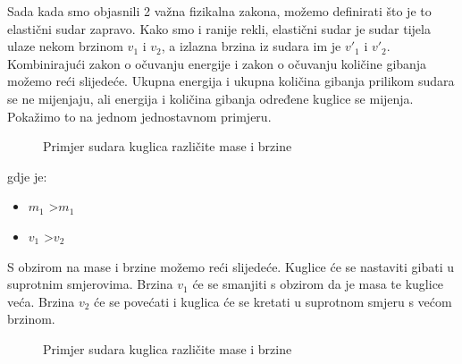 Sada kada smo objasnili 2 važna fizikalna zakona, možemo definirati što je to elastični sudar zapravo. Kako smo i ranije rekli, elastični sudar je sudar tijela ulaze nekom brzinom $v_{1}$ i $v_{2}$, a izlazna brzina iz sudara im je $v'_{1}$ i $v'_{2}$. Kombinirajući zakon o očuvanju energije i zakon o očuvanju količine gibanja možemo reći slijedeće. Ukupna energija i ukupna količina gibanja prilikom sudara se ne mijenjaju, ali energija i količina gibanja određene kuglice se mijenja\cite{13}. Pokažimo to na jednom jednostavnom primjeru.
\begin{figure}[!http]
	\begin{center}
	\end{center}
	\caption {Primjer sudara kuglica različite mase i brzine}
	\label{fig:23}
\end{figure}
\newline
gdje je:
\begin{itemize}
	\item $m_{1}$ \textgreater$m_{1}$
	\item $v_{1}$ \textgreater $v_{2}$
\end{itemize}
S obzirom na mase i brzine možemo reći slijedeće. Kuglice će se nastaviti gibati u suprotnim smjerovima. Brzina $v_{1}$ će se smanjiti s obzirom da je masa te kuglice veća. Brzina $v_{2}$ će se povećati i kuglica će se kretati u suprotnom smjeru s većom brzinom.\newpage
\begin{figure}[!http]
	\begin{center}
	\end{center}
	\caption {Primjer sudara kuglica različite mase i brzine}
	\label{fig:24}
\end{figure} 
